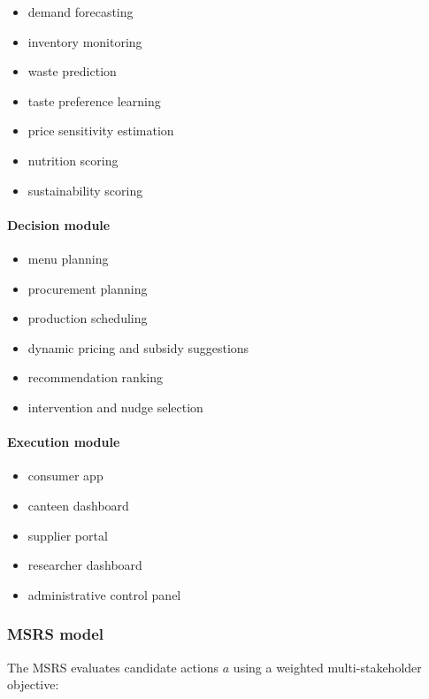\begin{itemize}
\tightlist
\item
  demand forecasting
\item
  inventory monitoring
\item
  waste prediction
\item
  taste preference learning
\item
  price sensitivity estimation
\item
  nutrition scoring
\item
  sustainability scoring
\end{itemize}

\paragraph{Decision module}\label{decision-module}

\begin{itemize}
\tightlist
\item
  menu planning
\item
  procurement planning
\item
  production scheduling
\item
  dynamic pricing and subsidy suggestions
\item
  recommendation ranking
\item
  intervention and nudge selection
\end{itemize}

\paragraph{Execution module}\label{execution-module}

\begin{itemize}
\tightlist
\item
  consumer app
\item
  canteen dashboard
\item
  supplier portal
\item
  researcher dashboard
\item
  administrative control panel
\end{itemize}

\subsubsection{MSRS model}\label{msrs-model}

The MSRS evaluates candidate actions \(a\) using a weighted
multi-stakeholder objective:

